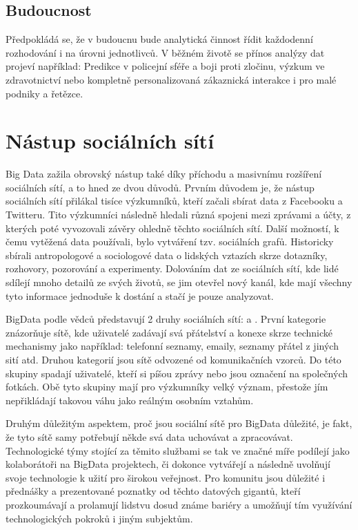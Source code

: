 \subsection{Budoucnost}
Předpokládá se, že v budoucnu bude analytická činnost řídit každodenní rozhodování i na úrovni jednotlivců. V běžném životě se přínos analýzy dat projeví například: Predikce v policejní sféře a boji proti zločinu, výzkum ve zdravotnictví nebo kompletně personalizovaná zákaznická interakce i pro malé podniky a řetězce. %

\section{Nástup sociálních sítí}
Big Data zažila obrovský nástup také díky příchodu a masivnímu rozšíření sociálních sítí, a to hned ze dvou důvodů. Prvním důvodem je, že nástup sociálních sítí přilákal tisíce výzkumníků, kteří začali sbírat data z Facebooku a Twitteru. Tito výzkumníci následně hledali různá spojeni mezi zprávami a účty, z kterých poté vyvozovali závěry ohledně těchto sociálních sítí. Další možností, k čemu vytěžená data používali, bylo vytváření tzv. sociálních grafů. Historicky sbírali antropologové a sociologové data o lidských vztazích skrze dotazníky, rozhovory, pozorování a experimenty. Dolováním dat ze sociálních sítí, kde lidé sdílejí mnoho detailů ze svých životů, se jim otevřel nový kanál, kde mají všechny tyto informace jednoduše k dostání a stačí je pouze analyzovat.

BigData podle vědců představují 2 druhy sociálních sítí:  a . První kategorie znázorňuje sítě, kde uživatelé zadávají svá přátelství a konexe skrze technické mechanismy jako například: telefonní seznamy, emaily, seznamy přátel z jiných sití atd. Druhou kategorií jsou sítě odvozené od komunikačních vzorců. Do této skupiny spadají uživatelé, kteří si píšou zprávy nebo jsou označení na společných fotkách. Obě tyto skupiny mají pro výzkumníky velký význam, přestože jím nepřikládají takovou váhu jako reálným osobním vztahům. \cite{social} %

Druhým důležitým aspektem, proč jsou sociální sítě pro BigData důležité, je fakt, že tyto sítě samy potřebují někde svá data uchovávat a zpracovávat. Technologické týmy stojící za těmito službami se tak ve značné míře podílejí jako kolaborátoři na BigData projektech, či dokonce vytvářejí a následně uvolňují svoje technologie k užití pro širokou veřejnost. Pro komunitu jsou důležité i přednášky a prezentované poznatky od těchto datových gigantů, kteří prozkoumávají a prolamují lidstvu dosud známe bariéry a umožňují tím využívání technologických pokroků i jiným subjektům. 

